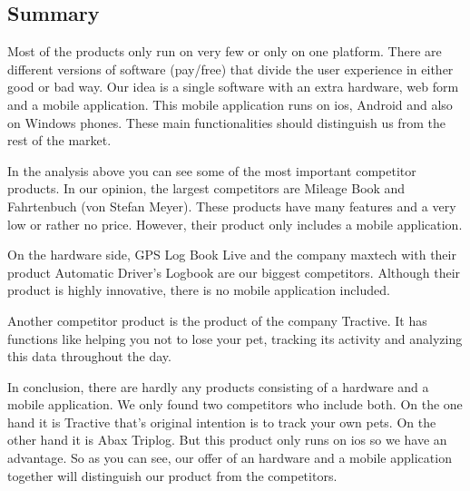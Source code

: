 \begin{singlespace}
\section{Summary}
Most of the products only run on very few or only on one platform. There are different versions of software (pay/free)  that divide the user experience in either good or bad way. Our idea is a single software with an extra hardware, web form and a mobile application. This mobile application runs on \gls{ios}, Android and also on Windows phones. These main functionalities should distinguish us from the rest of the market. 

In the analysis above you can see some of the most important competitor products. In our opinion, the largest competitors are Mileage Book and Fahrtenbuch (von Stefan Meyer). These products have many features and a very low or rather no price. However, their product only includes a mobile application.

On the hardware side, GPS Log Book Live and the company maxtech with their product Automatic Driver’s Logbook are our biggest competitors. Although their product is highly innovative, there is no mobile application included. 

Another competitor product is the product of the company Tractive. It has functions like helping you not to lose your pet, tracking its activity and analyzing this data throughout the day.

In conclusion, there are hardly any products consisting of a hardware and a mobile application. We only found two competitors who include both. On the one hand it is Tractive that's original intention is to track your own pets. On the other hand it is Abax Triplog. But this product only runs on \gls{ios} so we have an advantage. So as you can see, our offer of an hardware and a mobile application together will distinguish our product from the competitors.
\newline\newline

\begin{tabular}{p{3cm}p{5cm}p{3cm}p{2cm}}
\toprule


\end{tabular}
\end{singlespace}
